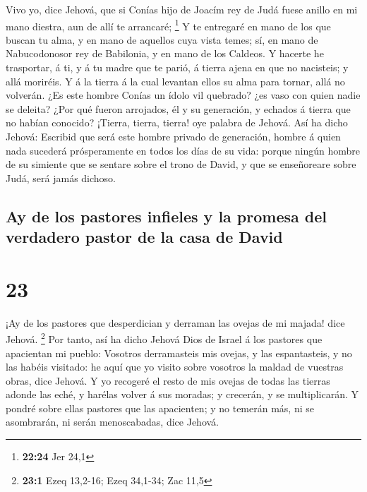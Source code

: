  Vivo yo, dice Jehová, que si Conías hijo de Joacím rey
de Judá fuese anillo en mi mano diestra, aun de allí te arrancaré;
\footnote{\textbf{22:24} Jer 24,1}  Y te entregaré en
mano de los que buscan tu alma, y en mano de aquellos cuya vista temes;
sí, en mano de Nabucodonosor rey de Babilonia, y en mano de los Caldeos.
 Y hacerte he trasportar, á ti, y á tu madre que te
parió, á tierra ajena en que no nacisteis; y allá moriréis.
 Y á la tierra á la cual levantan ellos su alma para
tornar, allá no volverán.  ¿Es este hombre Conías un
ídolo vil quebrado? ¿es vaso con quien nadie se deleita? ¿Por qué fueron
arrojados, él y su generación, y echados á tierra que no habían
conocido?  ¡Tierra, tierra, tierra! oye palabra de
Jehová.  Así ha dicho Jehová: Escribid que será este
hombre privado de generación, hombre á quien nada sucederá prósperamente
en todos los días de su vida: porque ningún hombre de su simiente que se
sentare sobre el trono de David, y que se enseñoreare sobre Judá, será
jamás dichoso.

\hypertarget{ay-de-los-pastores-infieles-y-la-promesa-del-verdadero-pastor-de-la-casa-de-david}{%
\subsection{Ay de los pastores infieles y la promesa del verdadero
pastor de la casa de
David}\label{ay-de-los-pastores-infieles-y-la-promesa-del-verdadero-pastor-de-la-casa-de-david}}

\hypertarget{section-22}{%
\section{23}\label{section-22}}

 ¡Ay de los pastores que desperdician y derraman las
ovejas de mi majada! dice Jehová. \footnote{\textbf{23:1} Ezeq 13,2-16;
  Ezeq 34,1-34; Zac 11,5}  Por tanto, así ha dicho Jehová
Dios de Israel á los pastores que apacientan mi pueblo: Vosotros
derramasteis mis ovejas, y las espantasteis, y no las habéis visitado:
he aquí que yo visito sobre vosotros la maldad de vuestras obras, dice
Jehová.  Y yo recogeré el resto de mis ovejas de todas las
tierras adonde las eché, y harélas volver á sus moradas; y crecerán, y
se multiplicarán.  Y pondré sobre ellas pastores que las
apacienten; y no temerán más, ni se asombrarán, ni serán menoscabadas,
dice Jehová.


